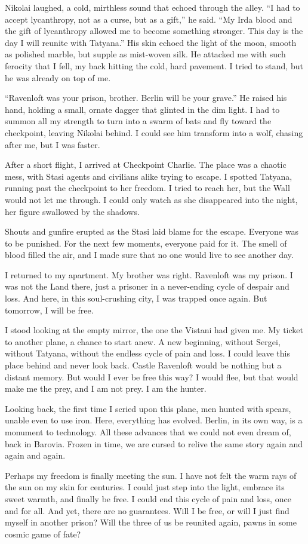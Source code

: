 Nikolai laughed, a cold, mirthless sound that echoed through the alley.
``I had to accept lycanthropy, not as a curse, but as a gift,'' he said.
``My Irda blood and the gift of lycanthropy allowed me to become something stronger.
This day is the day I will reunite with Tatyana.''
His skin echoed the light of the moon, smooth as polished marble, but supple as mist-woven silk.
He attacked me with such ferocity that I fell, my back hitting the cold, hard pavement.
I tried to stand, but he was already on top of me.

``Ravenloft was your prison, brother.
Berlin will be your grave.''
He raised his hand, holding a small, ornate dagger that glinted in the dim light.
I had to summon all my strength to turn into a swarm of bats and fly toward the checkpoint, leaving Nikolai behind.
I could see him transform into a wolf, chasing after me, but I was faster.

After a short flight, I arrived at Checkpoint Charlie.
The place was a chaotic mess, with Stasi agents and civilians alike trying to escape.
I spotted Tatyana, running past the checkpoint to her freedom.
I tried to reach her, but the Wall would not let me through.
I could only watch as she disappeared into the night, her figure swallowed by the shadows.

Shouts and gunfire erupted as the Stasi laid blame for the escape.
Everyone was to be punished.
For the next few moments, everyone paid for it.
The smell of blood filled the air, and I made sure that no one would live to see another day.

I returned to my apartment.
My brother was right.
Ravenloft was my prison.
I was not the Land there, just a prisoner in a never-ending cycle of despair and loss.
And here, in this soul-crushing city, I was trapped once again.
But tomorrow, I will be free.

I stood looking at the empty mirror, the one the Vistani had given me.
My ticket to another plane, a chance to start anew.
A new beginning, without Sergei, without Tatyana, without the endless cycle of pain and loss.
I could leave this place behind and never look back.
Castle Ravenloft would be nothing but a distant memory.
But would I ever be free this way? I would flee, but that would make me the prey, and I am not prey.
I am the hunter.

Looking back, the first time I scried upon this plane, men hunted with spears, unable even to use iron.
Here, everything has evolved.
Berlin, in its own way, is a monument to technology.
All these advances that we could not even dream of, back in Barovia.
Frozen in time, we are cursed to relive the same story again and again and again.

Perhaps my freedom is finally meeting the sun.
I have not felt the warm rays of the sun on my skin for centuries.
I could just step into the light, embrace its sweet warmth, and finally be free.
I could end this cycle of pain and loss, once and for all.
And yet, there are no guarantees.
Will I be free, or will I just find myself in another prison? Will the three of us be reunited again, pawns in some cosmic game of fate?

\vfill\newpage
